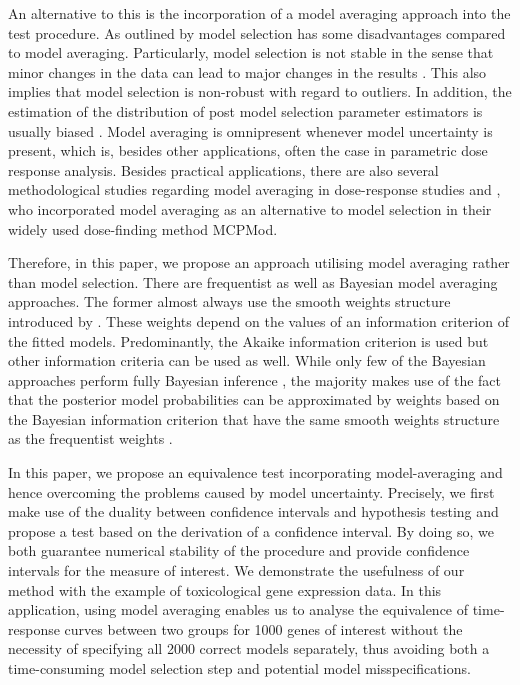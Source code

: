 {An alternative to this is the incorporation of a model averaging approach into the test procedure.
As outlined by \cite{Bornkamp2015} model selection has some disadvantages compared to model averaging. Particularly, model selection is not stable in the sense that minor changes in the data can lead to major changes in the results \citep{Breiman1996}. This also implies that model selection is non-robust with regard to outliers. In addition, the estimation of the distribution of post model selection parameter estimators is usually biased 
\citep{Leeb2005, Leeb2008}.
Model averaging is omnipresent whenever model uncertainty is present, which is, besides other applications, often the case in parametric dose response analysis. Besides practical applications, there are also several methodological studies regarding model averaging in dose-response studies \citep[see, e.g.,][]{Schorning2016, Aoki2017, Buatois2018} and \citet{Bornkamp2009}, who incorporated model averaging as an alternative to model selection in their widely used dose-finding method MCPMod.

Therefore, in this paper, we propose an approach utilising model averaging rather than model selection. 
There are frequentist as well as Bayesian model averaging approaches. 
The former almost always use the smooth weights structure introduced by \citet{Buckland1997}. These weights depend on the values of an information criterion of the fitted models. Predominantly, the Akaike information criterion \citep[AIC;][]{AIC} is used but other information criteria can be used as well.
While only few of the Bayesian approaches perform fully Bayesian inference \citep[see, e.g.,][]{Ley2009}, the majority makes use of the fact that the posterior model probabilities can be approximated by weights based on the Bayesian information criterion \citep[BIC;][]{BIC} that have the same smooth weights structure as the frequentist weights \citep{Wasserman2000}. 

In this paper, we propose an equivalence test incorporating model-averaging and hence overcoming the problems caused by model uncertainty. Precisely, we first make use of the duality between confidence intervals and hypothesis testing and propose a test based on the derivation of a confidence interval. By doing so, we both guarantee numerical stability of the procedure and provide confidence intervals for the measure of interest.
We demonstrate the usefulness of our method with the example of toxicological gene expression data. 
In this application, using model averaging enables us to analyse the equivalence of time-response curves between two groups for 1000 genes of interest without the necessity of specifying all 2000 correct models separately, thus avoiding both a time-consuming model selection step and potential model misspecifications.

}
